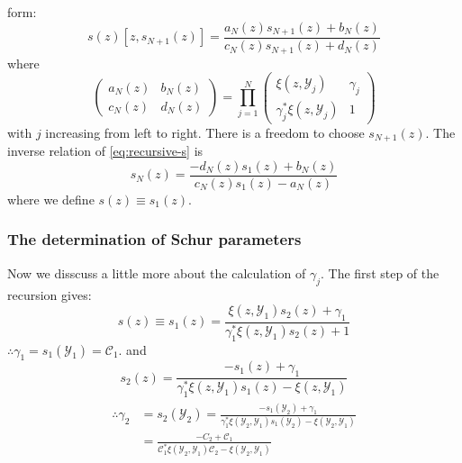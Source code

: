 \documentclass[
	preprint,%
	aps,
	prb,
	showpacs,	
	amsmath, amssymb]{revtex4-2}
\newcommand{\Y}{ {\mathcal{Y}} }
\newcommand{\C}{ {\mathcal{C}} }
\begin{document}
form:
\begin{equation}\label{eq:recursive-s}
	s(z)[z, s_{N+1}(z)] 
	= \frac{a_N(z) s_{N+1}(z) + b_N(z)}{c_N(z) s_{N+1}(z) + d_N(z)}
\end{equation}
where
\begin{equation}\label{eq:factor-matrix-schur}
	\left(
		\begin{matrix}
			a_N(z) & b_N(z) \\
			c_N(z) & d_N(z)
		\end{matrix}
	\right)
	= \prod_{j=1}^{N}
	\left(
		\begin{matrix}
			\xi(z, \Y_j)            & \gamma_j \\
			\gamma_j^* \xi(z, \Y_j) & 1
		\end{matrix}
	\right)
\end{equation}
with $j$ increasing from left to right. 
There is a freedom to choose $s_{N+1}(z)$. 
The inverse relation of \cref{eq:recursive-s} is
\begin{equation}\label{eq:inv-recursive-s}
	s_N(z) 
	= \frac{-d_N(z) s_1(z) + b_N(z)}{c_N(z) s_1(z) - a_N(z)}
\end{equation}
where we define $s(z) \equiv s_1(z)$.


\subsubsection{The determination of Schur parameters}
\label{subsubsec:determination-of-schur-parameters}

Now we disscuss a little more about the calculation of $\gamma_j$.
The first step of the recursion gives:
\begin{equation}
	s(z)\equiv s_1(z) 
	= \frac{\xi(z, \Y_1) s_{2}(z) + \gamma_1 }
		{\gamma_1^* \xi(z, \Y_1) s_{2}(z) + 1}
\end{equation}
$\therefore  \gamma_1 = s_1(\Y_1) = \C_1$. and 
\begin{equation}
	s_2(z) 
	= \frac{-s_1(z) + \gamma_1}
		{\gamma_1^* \xi(z, \Y_1) s_1(z) - \xi(z, \Y_1) }
\end{equation}
\begin{align}\label{eq:explicit-gamma-2}
\begin{split}
\therefore \gamma_2 &= s_2(\Y_2) 
	= \frac{-s_1(\Y_2) + \gamma_1} 
	{\gamma_1^* \xi(\Y_2, \Y_1) s_1(\Y_2) - \xi(\Y_2, \Y_1) } 
	\\
	& = \frac{-C_2 + \C_1}
	{\C_1^* \xi(\Y_2, \Y_1) \C_2 - \xi(\Y_2, \Y_1) }
\end{split}
\end{align}
\end{document}
